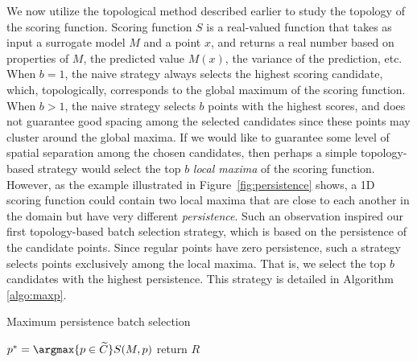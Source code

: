 We now utilize the topological method described earlier to study the topology of the scoring function.
%
Scoring function $S$ is a real-valued function that takes as input a surrogate model $M$ and a point $x$, and returns a real number based on properties of $M$, the predicted value $M(x)$, the variance of the prediction, etc.
%
When $b = 1$, the naive strategy always selects the highest scoring candidate, which, topologically, corresponds to the global maximum of the scoring function.
%
When $b > 1$, the naive strategy selects $b$ points with the highest scores, and does not guarantee good spacing among the selected candidates since these points may cluster around the global maxima.
%
If we would like to guarantee some level of spatial separation among the chosen candidates, then perhaps a simple topology-based strategy would select the top $b$ \emph{local maxima} of the scoring function.
%
However, as the example illustrated in Figure~\ref{fig:persistence} shows, a 1D scoring function could contain two local maxima that are close to each another in the domain but have very different \emph{persistence}.
%
Such an observation inspired our first topology-based batch selection strategy, which is based on the persistence of the candidate points.
%
Since regular points have zero persistence, such a strategy selects points exclusively among the local maxima.
%
That is, we select the top $b$ candidates with the highest persistence.
%
This strategy is detailed in Algorithm \ref{algo:maxp}.

{\fontsize{10}{10}\selectfont
\begin{algorithm}
\scriptsize
\caption{Maximum persistence batch selection}
\label{algo:maxp}
\begin{algorithmic}
  \State $p^* = \argmax{p \in \widetilde{C}} S(M, p)$
\EndWhile
{}
\State return $R$
\EndProcedure
\end{algorithmic}
\end{algorithm}
}

